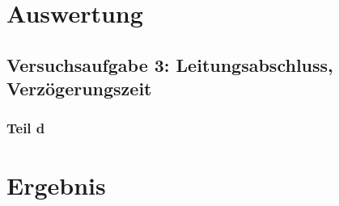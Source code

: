 
\section{Auswertung}

\subsection{Versuchsaufgabe 3: Leitungsabschluss, Verzögerungszeit}

\subsubsection{Teil d}


\section{Ergebnis}

\IfFileExists{\bibliographyfile}{
	
}{}



